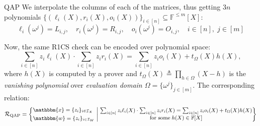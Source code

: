 \documentclass{zkdl-presentation-template}
\begin{document}
    \begin{frame}{QAP}
        We interpolate the columns of each of the matrices, thus getting $3n$
        polynomials $\{(\ell_i(X),r_i(X),o_i(X))\}_{i \in [n]} \subseteq
        \mathbb{F}^{\leq m}[X]$:
        \begin{equation*}
            \ell_i(\omega^j) = L_{i,j}, \quad r_i(\omega^j) = R_{i,j}, \quad o_i(\omega^j) = O_{i,j}, \quad i \in [n], \; j \in [m]
        \end{equation*}

         Now, the same R1CS check can be encoded over polynomial space:
        \begin{equation*}
            \sum_{i \in [n]}z_i\ell_i(X) \cdot \sum_{i \in [n]} z_ir_i(X) = \sum_{i \in [n]}z_io_i(X) + t_{\Omega}(X)h(X),
        \end{equation*}
        where $h(X)$ is computed by a prover and $t_{\Omega}(X) \triangleq
        \prod_{h \in \Omega}(X-h)$ is the \textit{vanishing polynomial} over
        \textit{evaluation domain $\Omega = \{\omega^j\}_{j \in [m]}$}. The 
        corresponding relation:
        \begin{equation*}
            \small\mathcal{R}_{\text{QAP}} = \left\{ 
        \begin{aligned}
            &\mathbbm{x} = \{z_i\}_{i \in \mathcal{I}_{X}} \\
            &\mathbbm{w} = \{z_i\}_{i \in \mathcal{I}_{W}}
        \end{aligned}
        \; \middle| \; 
        \begin{matrix}
            \sum_{i \in [n]}z_i\ell_i(X) \cdot \sum_{i \in [n]}z_ir_i(X) = \sum_{i \in [n]}z_io_i(X) + t_{\Omega}(X)h(X) \\
            \text{for some} \; h(X) \in \mathbb{F}[X]
        \end{matrix}
    \right\}
        \end{equation*}
    \end{frame}
\end{document}
